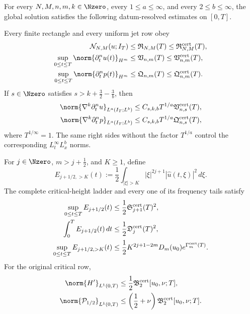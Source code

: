 \begin{corollary}
\label{cor:complete-quantitative-output}
For every \(N,M,n,m,k\in\Nzero\), every \(1\le a\le\infty\), and every
\(2\le b\le\infty\), the global solution satisfies the following
datum-resolved estimates on \([0,T]\).

Every finite rectangle and every uniform jet row obey
\begin{align}
 \mathcal N_{N,M}(u;I_T)
 &\le\mathfrak R_{N,M}(T)
 \le\mathfrak R_{N,M}^{\rm cert}(T),
 \label{eq:final-rectangle-bound}\\
 \sup_{0\le t\le T}\norm{\partial_t^nu(t)}_{H^m}
 &\le\mathfrak V_{n,m}(T)
 \le\mathfrak V_{n,m}^{\rm cert}(T),
 \label{eq:final-velocity-row-bound}\\
 \sup_{0\le t\le T}\norm{\partial_t^np(t)}_{H^m}
 &\le\mathfrak Q_{n,m}(T)
 \le\mathfrak Q_{n,m}^{\rm cert}(T).
 \label{eq:final-pressure-row-bound}
\end{align}
If \(s\in\Nzero\) satisfies
\(s>k+\frac32-\frac3b\), then
\begin{align}
 \norm{\nabla^k\partial_t^nu}_{L^a(I_T;L^b)}
 &\le C_{s,k,b}T^{1/a}\mathfrak V_{n,s}^{\rm cert}(T),
 \label{eq:final-mixed-jet-bound}\\
 \norm{\nabla^k\partial_t^np}_{L^a(I_T;L^b)}
 &\le C_{s,k,b}T^{1/a}\mathfrak Q_{n,s}^{\rm cert}(T),
 \label{eq:final-pressure-jet-bound}
\end{align}
where \(T^{1/\infty}=1\).  The same right sides without the factor
\(T^{1/a}\) control the corresponding \(L_t^\infty L_x^b\) norms.

For \(j\in\Nzero\), \(m>j+\frac12\), and \(K\ge1\), define
\begin{equation}
 E_{j+1/2,>K}(t)
 :=\frac12\int_{|\xi|>K}|\xi|^{2j+1}
 |\widehat u(t,\xi)|^2\,d\xi.
 \label{eq:final-critical-tail-definition}
\end{equation}
The complete critical-height ladder and every one of its frequency tails
satisfy
\begin{align}
 \sup_{0\le t\le T}E_{j+1/2}(t)
 &\le\frac12\mathfrak S_{j+1}^{\rm cert}(T)^2,
 \label{eq:final-critical-height-sup}\\
 \int_0^T E_{j+1/2}(t)\,dt
 &\le\frac12\mathfrak D_j^{\rm cert}(T)^2,
 \label{eq:final-critical-height-mass}\\
 \sup_{0\le t\le T}E_{j+1/2,>K}(t)
 &\le\frac12K^{2j+1-2m}
 D_m(u_0)e^{\Gamma_m^{\rm cert}(T)}.
 \label{eq:final-frequency-tail}
\end{align}
For the original critical row,
\begin{align}
 \norm{H'}_{L^1(0,T)}
 &\le\frac12\mathfrak B_2^{\rm cert}[u_0,\nu;T],
 \notag\\
 \norm{\mathcal P_{1/2}}_{L^1(0,T)}
 &\le\left(\frac12+\nu\right)
       \mathfrak B_2^{\rm cert}[u_0,\nu;T].
 \label{eq:final-critical-action}
\end{align}


\end{corollary}
